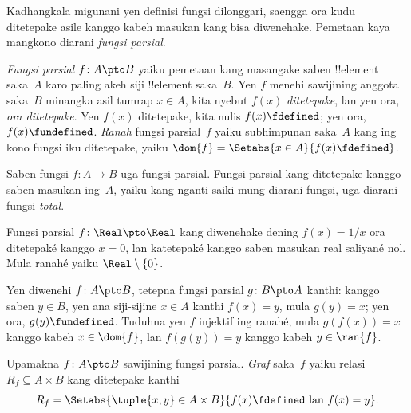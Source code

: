 \documentclass[../../../include/open-logic-section]{subfiles}
\begin{document}


\begin{explain}
Kadhangkala migunani yen definisi fungsi dilonggari, saengga
ora kudu ditetepake asile kanggo kabeh
masukan kang bisa diwenehake. Pemetaan kaya mangkono diarani \emph{fungsi parsial}.
\end{explain}

\begin{defn}
\emph{Fungsi parsial} $f \colon A \pto B$ yaiku pemetaan kang
masangake saben !!{element} saka~$A$ karo paling akeh siji !!{element} saka~$B$.
Yen $f$ menehi sawijining anggota saka~$B$ minangka asil tumrap $x \in A$, kita nyebut $f(x)$
\emph{ditetepake}, lan yen ora, \emph{ora ditetepake}. Yen $f(x)$ ditetepake,
kita nulis $f(x) \fdefined$; yen ora, $f(x) \fundefined$.
\emph{Ranah} fungsi parsial~$f$ yaiku subhimpunan saka~$A$ kang
ing kono fungsi iku ditetepake, yaiku $\dom{f} = \Setabs{x \in A}{f(x) \fdefined}$.
\end{defn}

\begin{ex}
Saben fungsi $f\colon A \to B$ uga fungsi parsial. Fungsi parsial
kang ditetepake kanggo saben masukan ing~$A$, yaiku kang nganti saiki
mung diarani fungsi, uga diarani fungsi \emph{total}.
\end{ex}

\begin{ex}
Fungsi parsial $f \colon \Real \pto \Real$ kang diwenehake dening $f(x) = 1/x$
ora ditetepaké kanggo $x = 0$, lan katetepaké kanggo saben masukan
real saliyané nol. Mula ranahé yaiku $\Real\setminus\{0\}$.
\end{ex}

\begin{prob}
Yen diwenehi $f\colon A \pto B$, tetepna fungsi parsial $g\colon B \pto
A$ kanthi: kanggo saben $y \in B$, yen ana siji-sijine $x \in A$ kanthi
$f(x) = y$, mula $g(y) = x$; yen ora, $g(y) \fundefined$. Tuduhna yen
$f$ injektif ing ranahé, mula $g(f(x)) = x$ kanggo kabeh $x \in \dom{f}$, lan
$f(g(y)) = y$ kanggo kabeh $y \in \ran{f}$.
\end{prob}

\begin{defn}
Upamakna $f\colon A \pto B$ sawijining fungsi parsial. \emph{Graf} saka~$f$
yaiku relasi $R_f \subseteq A \times B$ kang ditetepake kanthi
\[
R_f = \Setabs{\tuple{x,y} \in A \times B}{f(x) \fdefined \text{ lan } f(x) = y}.
\]
\end{defn}
\end{document}
